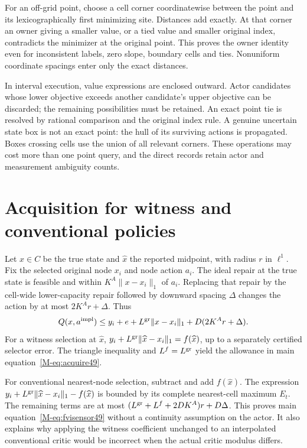 \documentclass[ecta,nameyear,draft]{econsocart}
\begin{document}
For an off-grid point, choose a cell corner coordinatewise between the point and its lexicographically first minimizing site. Distances add exactly. At that corner an owner giving a smaller value, or a tied value and smaller original index, contradicts the minimizer at the original point. This proves the owner identity even for inconsistent labels, zero slope, boundary cells and ties. Nonuniform coordinate spacings enter only the exact distances.

In interval execution, value expressions are enclosed outward. Actor candidates whose lower objective exceeds another candidate's upper objective can be discarded; the remaining possibilities must be retained. An exact point tie is resolved by rational comparison and the original index rule. A genuine uncertain state box is not an exact point: the hull of its surviving actions is propagated. Boxes crossing cells use the union of all relevant corners. These operations may cost more than one point query, and the direct records retain actor and measurement ambiguity counts.

\section{Acquisition for witness and conventional policies}\label{supp:acquisition49}
Let $x\in C$ be the true state and $\widehat x$ the reported midpoint, with radius $r$ in $\ell^1$. Fix the selected original node $x_i$ and node action $a_i$. The ideal repair at the true state is feasible and within $K^A\|x-x_i\|_1$ of $a_i$. Replacing that repair by the cell-wide lower-capacity repair followed by downward spacing $\Delta$ changes the action by at most $2K^Ar+\Delta$. Thus
\[
 Q(x,a^{\rm impl})\le y_i+e+L^{\rm gr}\|x-x_i\|_1+ D(2K^Ar+\Delta).
\]
For a witness selection at $\widehat x$, $y_i+L^{\rm gr}\|\widehat x-x_i\|_1=f(\widehat x)$, up to a separately certified selector error. The triangle inequality and $L^f=L^{\rm gr}$ yield the allowance in main equation~\eqref{M-eq:acquire49}.

For conventional nearest-node selection, subtract and add $f(\widehat x)$. The expression $y_i+L^{\rm gr}\|\widehat x-x_i\|_1-f(\widehat x)$ is bounded by its complete nearest-cell maximum $E_t$. The remaining terms are at most $(L^{\rm gr}+L^f+2DK^A)r+D\Delta$. This proves main equation~\eqref{M-eq:fvisensor49} without a continuity assumption on the actor. It also explains why applying the witness coefficient unchanged to an interpolated conventional critic would be incorrect when the actual critic modulus differs.
\end{document}
